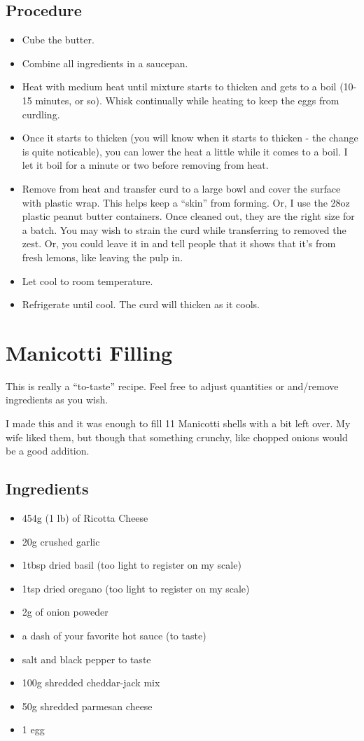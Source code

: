 \documentclass[10pt, openany]{book}
\begin{document}
\subsection{Procedure}
\begin{itemize}
  \item Cube the butter.
  \item Combine all ingredients in a saucepan.
  \item Heat with medium heat until mixture starts to thicken and gets to a boil (10-15 minutes, or so).  Whisk continually while heating to keep the eggs from curdling.
  \item Once it starts to thicken (you will know when it starts to thicken - the change is quite noticable), you can lower the heat a little while it comes to a boil.  I let it boil for a minute or two before removing from heat.
  \item Remove from heat and transfer curd to a large bowl and cover the surface with plastic wrap.  This helps keep a ``skin'' from forming.  Or, I use the 28oz plastic peanut butter containers.  Once cleaned out, they are the right size for a batch.  You may wish to strain the curd while transferring to removed the zest.  Or, you could leave it in and tell people that it shows that it's from fresh lemons, like leaving the pulp in.
  \item Let cool to room temperature.
  \item Refrigerate until cool.  The curd will thicken as it cools.
\end{itemize}

\section{Manicotti Filling}
\label{extra:ManicottFilling}
This is really a ``to-taste'' recipe.  Feel free to adjust quantities or and/remove ingredients as you wish.

I made this and it was enough to fill 11 Manicotti shells with a bit left over.  My wife liked them, but though that something crunchy, like chopped onions would be a good addition.

\subsection{Ingredients}
\begin{itemize}
  \item 454g (1 lb) of Ricotta Cheese
  \item 20g crushed garlic
  \item 1tbsp dried basil (too light to register on my scale)
  \item 1tsp dried oregano (too light to register on my scale)
  \item 2g of onion poweder
  \item a dash of your favorite hot sauce (to taste)
  \item salt and black pepper to taste
  \item 100g shredded cheddar-jack mix
  \item 50g shredded parmesan cheese
  \item 1 egg
\end{itemize}
\end{document}
